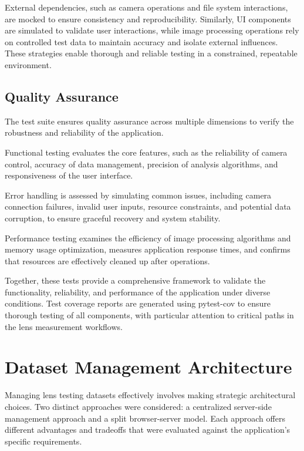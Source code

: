 External dependencies, such as camera operations and file system interactions, are mocked to ensure consistency and reproducibility. Similarly, UI components are simulated to validate user interactions, while image processing operations rely on controlled test data to maintain accuracy and isolate external influences. These strategies enable thorough and reliable testing in a constrained, repeatable environment.

\subsection{Quality Assurance}

The test suite ensures quality assurance across multiple dimensions to verify the robustness and reliability of the application.

Functional testing evaluates the core features, such as the reliability of camera control, accuracy of data management, precision of analysis algorithms, and responsiveness of the user interface.

Error handling is assessed by simulating common issues, including camera connection failures, invalid user inputs, resource constraints, and potential data corruption, to ensure graceful recovery and system stability.

Performance testing examines the efficiency of image processing algorithms and memory usage optimization, measures application response times, and confirms that resources are effectively cleaned up after operations.

Together, these tests provide a comprehensive framework to validate the functionality, reliability, and performance of the application under diverse conditions. Test coverage reports are generated using pytest-cov to ensure thorough testing of all components, with particular attention to critical paths in the lens measurement workflows.

\section{Dataset Management Architecture}

Managing lens testing datasets effectively involves making strategic architectural choices. Two distinct approaches were considered: a centralized server-side management approach and a split browser-server model. Each approach offers different advantages and tradeoffs that were evaluated against the application's specific requirements.

